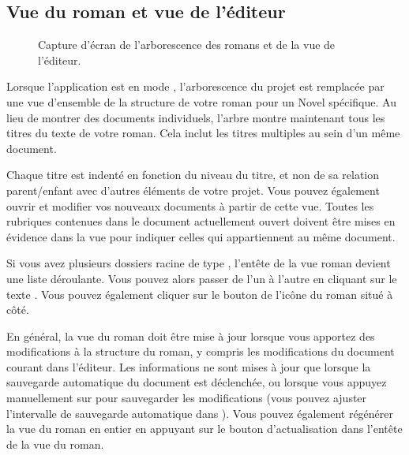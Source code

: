 \documentclass[a4paper,11pt,french]{sphinxmanual}
\begin{document}
\subsection{Vue du roman et vue de l’éditeur}
\label{\detokenize{usage_breakdown:novel-view-and-editor-view}}
\begin{figure}[htbp]
\centering
\capstart

\noindent{}
\caption{Capture d’écran de l’arborescence des romans et de la vue de l’éditeur.}\label{\detokenize{usage_breakdown:id2}}\end{figure}

\sphinxAtStartPar
Lorsque l’application est en mode , l’arborescence du projet est remplacée par une vue d’ensemble de la structure de votre roman pour un Novel {\hyperref[\detokenize{int_glossary:term-Root-Folder}]{}} spécifique. Au lieu de montrer des documents individuels, l’arbre montre maintenant tous les titres du texte de votre roman. Cela inclut les titres multiples au sein d’un même document.

\sphinxAtStartPar
Chaque titre est indenté en fonction du niveau du titre, et non de sa relation parent/enfant avec d’autres éléments de votre projet. Vous pouvez également ouvrir et modifier vos nouveaux documents à partir de cette vue. Toutes les rubriques contenues dans le document actuellement ouvert doivent être mises en évidence dans la vue pour indiquer celles qui appartiennent au même document.

\sphinxAtStartPar
Si vous avez plusieurs dossiers racine de type , l’en\sphinxhyphen{}tête de la vue roman devient une liste déroulante. Vous pouvez alors passer de l’un à l’autre en cliquant sur le texte . Vous pouvez également cliquer sur le bouton de l’icône du roman situé à côté.

\sphinxAtStartPar
En général, la vue du roman doit être mise à jour lorsque vous apportez des modifications à la structure du roman, y compris les modifications du document courant dans l’éditeur. Les informations ne sont mises à jour que lorsque la sauvegarde automatique du document est déclenchée, ou lorsque vous appuyez manuellement sur  pour sauvegarder les modifications (vous pouvez ajuster l’intervalle de sauvegarde automatique dans ). Vous pouvez également régénérer la vue du roman en entier en appuyant sur le bouton d’actualisation dans l’en\sphinxhyphen{}tête de la vue du roman.
\end{document}
